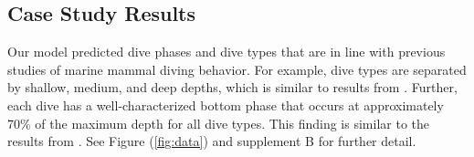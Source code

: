 \subsection{Case Study Results}

Our model predicted dive phases and dive types that are in line with previous studies of marine mammal diving behavior. For example, dive types are separated by shallow, medium, and deep depths, which is similar to results from \citet{Barajas:2017}. Further, each dive has a well-characterized bottom phase that occurs at approximately 70\% of the maximum depth for all dive types. This finding is similar to the results from \citet{Tennessen:2019a}. See Figure (\ref{fig:data}) and supplement B for further detail.

